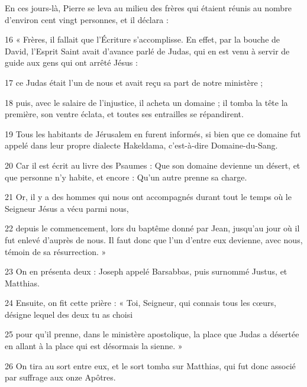En ces jours-là, Pierre se leva au milieu des frères qui étaient réunis au nombre d’environ cent vingt personnes, et il déclara :

16 « Frères, il fallait que l’Écriture s’accomplisse. En effet, par la bouche de David, l’Esprit Saint avait d’avance parlé de Judas, qui en est venu à servir de guide aux gens qui ont arrêté Jésus :

17 ce Judas était l’un de nous et avait reçu sa part de notre ministère ;

18 puis, avec le salaire de l’injustice, il acheta un domaine ; il tomba la tête la première, son ventre éclata, et toutes ses entrailles se répandirent.

19 Tous les habitants de Jérusalem en furent informés, si bien que ce domaine fut appelé dans leur propre dialecte Hakeldama, c’est-à-dire Domaine-du-Sang.

20 Car il est écrit au livre des Psaumes : Que son domaine devienne un désert, et que personne n’y habite, et encore : Qu’un autre prenne sa charge.

21 Or, il y a des hommes qui nous ont accompagnés durant tout le temps où le Seigneur Jésus a vécu parmi nous,

22 depuis le commencement, lors du baptême donné par Jean, jusqu’au jour où il fut enlevé d’auprès de nous. Il faut donc que l’un d’entre eux devienne, avec nous, témoin de sa résurrection. »

23 On en présenta deux : Joseph appelé Barsabbas, puis surnommé Justus, et Matthias.

24 Ensuite, on fit cette prière : « Toi, Seigneur, qui connais tous les cœurs, désigne lequel des deux tu as choisi

25 pour qu’il prenne, dans le ministère apostolique, la place que Judas a désertée en allant à la place qui est désormais la sienne. »

26 On tira au sort entre eux, et le sort tomba sur Matthias, qui fut donc associé par suffrage aux onze Apôtres.